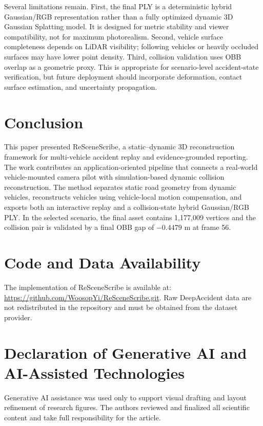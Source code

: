 \documentclass[conference]{IEEEtran}
\begin{document}
Several limitations remain. First, the final PLY is a deterministic hybrid
Gaussian/RGB representation rather than a fully optimized dynamic 3D Gaussian
Splatting model. It is designed for metric stability and viewer compatibility,
not for maximum photorealism. Second, vehicle surface completeness depends on
LiDAR visibility; following vehicles or heavily occluded surfaces may have
lower point density. Third, collision validation uses OBB overlap as a
geometric proxy. This is appropriate for scenario-level accident-state
verification, but future deployment should incorporate deformation, contact
surface estimation, and uncertainty propagation.

\section{Conclusion}

This paper presented ReSceneScribe, a static--dynamic 3D reconstruction
framework for multi-vehicle accident replay and evidence-grounded reporting.
The work contributes an application-oriented pipeline that connects a
real-world vehicle-mounted camera pilot with simulation-based dynamic collision
reconstruction. The method separates static road geometry from dynamic
vehicles, reconstructs vehicles using vehicle-local motion compensation, and
exports both an interactive replay and a collision-state hybrid Gaussian/RGB
PLY. In the selected scenario, the final asset contains 1,177,009 vertices and
the collision pair is validated by a final OBB gap of $-0.4479$ m at frame 56.

\section*{Code and Data Availability}

The implementation of ReSceneScribe is available at:
\url{https://github.com/WoosopYi/ReSceneScribe.git}. Raw DeepAccident data are
not redistributed in the repository and must be obtained from the dataset
provider.

\section*{Declaration of Generative AI and AI-Assisted Technologies}

Generative AI assistance was used only to support visual drafting and layout
refinement of research figures. The authors reviewed and finalized all
scientific content and take full responsibility for the article.
\end{document}
